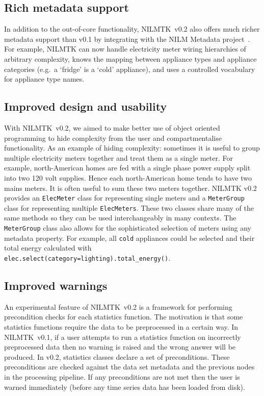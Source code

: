 \documentclass[10pt,abstract]{sensys-proc}
\begin{document}
\subsection{Rich metadata support}
In addition to the out-of-core functionality, NILMTK~v0.2 also offers much richer metadata support than v0.1 by integrating with the NILM Metadata project~\cite{NILM_Metadata}.  For example, NILMTK can now handle electricity meter wiring hierarchies of arbitrary complexity, knows the mapping between appliance types and appliance categories (e.g.\ a `fridge' is a `cold' appliance), and uses a controlled vocabulary for appliance type names.

\subsection{Improved design and usability}
With NILMTK~v0.2, we aimed to make better use of object oriented programming to hide complexity from the user and compartmentalise functionality.  As an example of hiding complexity: sometimes it is useful to group multiple electricity meters together and treat them as a single meter.  For example, north-American homes are fed with a single phase power supply split into two 120 volt supplies.  Hence each north-American home tends to have two mains meters.  It is often useful to sum these two meters together.  NILMTK v0.2 provides an \texttt{ElecMeter} class for representing single meters and a \texttt{MeterGroup} class for representing multiple \texttt{ElecMeters}.  These two classes share many of the same methods so they can be used interchangeably in many contexts.  The \texttt{MeterGroup} class also allows for the sophisticated selection of meters using any metadata property.  For example, all \texttt{cold} appliances could be selected and their total energy calculated with \\ \texttt{elec.select(category=\textquotesingle lighting\textquotesingle).total\_energy()}.

\subsection{Improved warnings}
An experimental feature of NILMTK~v0.2 is a framework for performing precondition checks for each statistics function.  The motivation is that some statistics functions require the data to be preprocessed in a certain way.  In NILMTK~v0.1, if a user attempts to run a statistics function on incorrectly preprocessed data then no warning is raised and the wrong answer will be produced.  In v0.2, statistics classes declare a set of preconditions.  These preconditions are checked against the data set metadata and the previous nodes in the processing pipeline.  If any preconditions are not met then the user is warned immediately (before any time series data has been loaded from disk).
\end{document}
